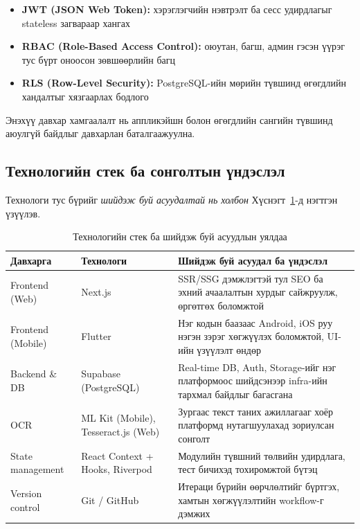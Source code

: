 \begin{itemize}
    \item \textbf{JWT (JSON Web Token):} хэрэглэгчийн нэвтрэлт ба сесс удирдлагыг stateless загвараар хангах
    \item \textbf{RBAC (Role-Based Access Control):} оюутан, багш, админ гэсэн үүрэг тус бүрт оноосон зөвшөөрлийн багц
    \item \textbf{RLS (Row-Level Security):} PostgreSQL-ийн мөрийн түвшинд өгөгдлийн хандалтыг хязгаарлах бодлого
\end{itemize}

Энэхүү давхар хамгаалалт нь аппликэйшн болон өгөгдлийн сангийн түвшинд аюулгүй байдлыг давхарлан баталгаажуулна.

\subsection{Технологийн стек ба сонголтын үндэслэл}

Технологи тус бүрийг \textit{шийдэж буй асуудалтай нь холбон} Хүснэгт~\ref{tab:tech-stack}-д нэгтгэн үзүүлэв.

\begin{table}[H]
\centering
\caption{Технологийн стек ба шийдэж буй асуудлын уялдаа}
\label{tab:tech-stack}
\begin{tabular}{|p{3.2cm}|p{3.4cm}|p{7cm}|}
\hline
\textbf{Давхарга} & \textbf{Технологи} & \textbf{Шийдэж буй асуудал ба үндэслэл} \\ \hline
Frontend (Web) & Next.js & SSR/SSG дэмжлэгтэй тул SEO ба эхний ачаалалтын хурдыг сайжруулж, өргөтгөх боломжтой \\ \hline
Frontend (Mobile) & Flutter & Нэг кодын баазаас Android, iOS руу нэгэн зэрэг хөгжүүлэх боломжтой, UI-ийн үзүүлэлт өндөр \\ \hline
Backend \& DB & Supabase (PostgreSQL) & Real-time DB, Auth, Storage-ийг нэг платформоос шийдсэнээр infra-ийн тархмал байдлыг багасгана \\ \hline
OCR & ML Kit (Mobile), Tesseract.js (Web) & Зургаас текст таних ажиллагааг хоёр платформд нутагшуулахад зориулсан сонголт \\ \hline
State management & React Context + Hooks, Riverpod & Модулийн түвшний төлвийн удирдлага, тест бичихэд тохиромжтой бүтэц \\ \hline
Version control & Git / GitHub & Итераци бүрийн өөрчлөлтийг бүртгэх, хамтын хөгжүүлэлтийн workflow-г дэмжих \\ \hline
\end{tabular}
\end{table}

